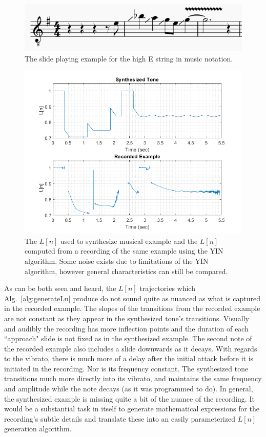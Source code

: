 \documentclass[../main.tex]{subfiles}
\begin{document}
\begin{figure}[h]
    \centering
    \includegraphics[scale=.75]{./images/pictures/slideLick.png}
    \caption{The slide playing example for the high E string in music notation.}
    \label{fig:slideLick}
\end{figure}

\begin{figure}[h]
    \centering
    \includegraphics[scale=.65]{./images/plots/L_nComparison.png}
    \caption{The $L[n]$ used to synthesize musical example and the $L[n]$ computed from a recording of the same example using the YIN algorithm. Some noise exists due to limitations of the YIN algorithm, however general characteristics can still be compared.}
    \label{fig:LnCompare}
\end{figure}

As can be both seen and heard, the $L[n]$ trajectories which Alg.~\ref{alg:generateLn} produce do not sound quite as nuanced as what is captured in the recorded example. The slopes of the transitions from the recorded example are not constant as they appear in the synthesized tone's transitions. Visually and audibly the recording has more inflection points and the duration of each ``approach" slide is not fixed as in the synthesized example. The second note of the recorded example also includes a slide downwards as it decays. With regards to the vibrato, there is much more of a delay after the initial attack before it is initiated in the recording. Nor is its frequency constant. The synthesized tone transitions much more directly into its vibrato, and maintains the same frequency and amplitude while the note decays (as it was programmed to do). In general, the synthesized example is missing quite a bit of the nuance of the recording. It would be a substantial task in itself to generate mathematical expressions for the recording's subtle details and translate these into an easily parameterized $L[n]$ generation algorithm.
\end{document}
